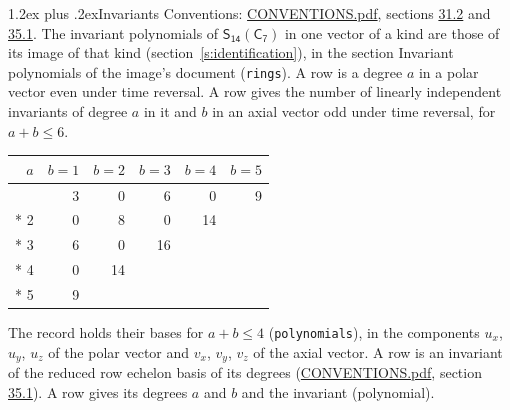 \documentclass[10pt,a4paper]{article}
\makeatletter
\renewcommand\section{\@startsection{section}{1}{\z@}{-3ex plus -1ex minus -.2ex}%
  {1.2ex plus .2ex}{\normalfont\large\sffamily\bfseries\color{parttitle}}}
\numberwithin{equation}{section}
\newcommand{\grp}[1]{\mathsf{#1}}
\makeatother
\begin{document}
\section{Invariants}\label{s:invariants}
Conventions: \href{../../CONVENTIONS.pdf}{CONVENTIONS.pdf}, sections \href{../../CONVENTIONS.pdf\#conv.31.2}{31.2} and \href{../../CONVENTIONS.pdf\#conv.35.1}{35.1}.
The invariant polynomials of $\grp{S_{14}}(\grp{C_{7}})$ in one vector of a kind are those of its image of that kind (section~\ref{s:identification}), in the section Invariant polynomials of the image's document (\texttt{rings}).
\leavevmode\label{n:index.degree.polar}\label{n:index.degree.axial}A row is a degree $a$ in a polar vector even under time reversal. A row gives the number of linearly independent invariants of degree $a$ in it and $b$ in an axial vector odd under time reversal, for $a + b \le 6$.
{\small\begin{longtable}{@{}rrrrrr@{}}\toprule
$a$ & $b = 1$ & $b = 2$ & $b = 3$ & $b = 4$ & $b = 5$\\\midrule\endhead
\bottomrule\endfoot\endlastfoot
1 & 3 & 0 & 6 & 0 & 9\\*
2 & 0 & 8 & 0 & 14 & \\*
3 & 6 & 0 & 16 &  & \\*
4 & 0 & 14 &  &  & \\*
5 & 9 &  &  &  & \\
\bottomrule\end{longtable}}
\leavevmode\label{n:local.component.polar}\label{n:local.component.axial}The record holds their bases for $a + b \le 4$ (\texttt{polynomials}), in the components $u_{x}$, $u_{y}$, $u_{z}$ of the polar vector and $v_{x}$, $v_{y}$, $v_{z}$ of the axial vector. \label{n:head.polynomial}A row is an invariant of the reduced row echelon basis of its degrees (\href{../../CONVENTIONS.pdf}{CONVENTIONS.pdf}, section \href{../../CONVENTIONS.pdf\#conv.35.1}{35.1}). A row gives its degrees $a$ and $b$ and the invariant (polynomial).
\end{document}
